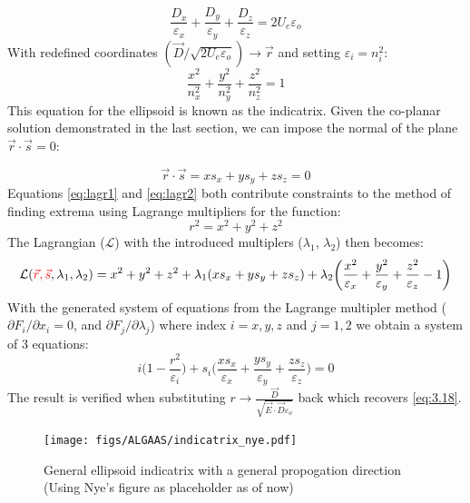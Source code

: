 \begin{equation}\label{eq:lagr1}
\frac{D_x}{\varepsilon_x} + \frac{D_y}{\varepsilon_y} + \frac{D_z}{\varepsilon_z} = 2 U_e \varepsilon_o
\end{equation}
With redefined coordinates $(\vec{D}/\sqrt{2 U_e \varepsilon_o}) \rightarrow \vec{r}$ and setting $\varepsilon_i = n^2_i$:
\begin{equation}
\frac{x^2}{n_x^2} + \frac{y^2}{n_y^2} + \frac{z^2}{n_z^2} = 1
\end{equation}
This equation for the ellipsoid is known as the indicatrix. Given the co-planar solution demonstrated in the last section, we can impose the normal of the plane $\vec{r} \cdot \vec{s} = 0$:

\begin{equation}\label{eq:lagr2}
\vec{r} \cdot \vec{s} = x s_x + y s_y + z s_z = 0
\end{equation}
Equations \ref{eq:lagr1} and \ref{eq:lagr2} both contribute constraints to the method of finding extrema using Lagrange multipliers for the function:
\begin{equation}
r^2 = x^2 + y^2 + z^2
\end{equation}
The Lagrangian ($\mathcal{L}$) with the introduced multiplers ($\lambda_1$, $\lambda_2$) then becomes:
\begin{equation}
\mathcal{L}(\textcolor{red}{\vec{r},\vec{s}},\lambda_1, \lambda_2) =
x^2 + y^2 + z^2 + \lambda_1 (xs_x + ys_y + zs_z) + \lambda_2 \bigg( \frac{x^2}{\varepsilon_x} + \frac{y^2}{\varepsilon_y} + \frac{z^2}{\varepsilon_z} - 1 \bigg)
\end{equation}
With the generated system of equations from the Lagrange multipler method ($\partial F_i/ \partial x_i = 0$, and $\partial F_j/ \partial \lambda_j$) where index $i =x,y,z$ and $j = 1,2$ we obtain a system of 3 equations:
\begin{equation}
i \bigg(1-\frac{r^2}{\varepsilon_{i}} \bigg) + s_{i} \bigg(\frac{x s_x}{\varepsilon_x} + \frac{y s_y}{\varepsilon_y} + \frac{z s_z}{\varepsilon_z} \bigg) = 0
\end{equation}
The result is verified when substituting $r \rightarrow \frac{\vec{D}}{\sqrt{\vec{E} \cdot \vec{D} \varepsilon_o}}$ back which recovers \ref{eq:3.18}.
\\

\begin{figure}[H]
\begin{center}
\texttt{[image: figs/ALGAAS/indicatrix\_nye.pdf]}
\end{center}
\caption{General ellipsoid indicatrix with a general propogation direction (Using Nye's figure as placeholder as of now)}
\label{fig:general_indicatrix}
\end{figure}

